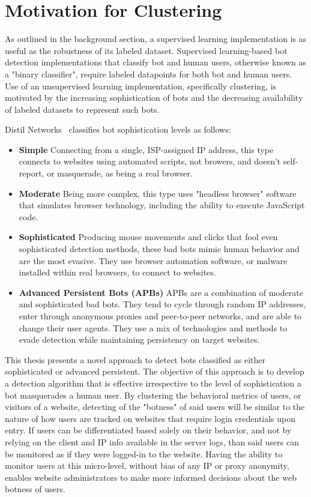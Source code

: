 
\section{Motivation for Clustering}\label{sec:motivation-for-clustering}
As outlined in the background section, a supervised learning implementation is as useful as the robustness of its labeled dataset.
Supervised learning-based bot detection implementations that classify bot and human users, otherwise known as a "binary classifier", require labeled datapoints for both bot and human users.
Use of an unsupervised learning implementation, specifically clustering, is motivated by the increasing sophistication of bots and the decreasing availability of labeled datasets to represent such bots.

Distil Networks~\cite{bad_bot_report} classifies bot sophistication levels as follows:
\begin{itemize}
    \item \textbf{Simple}
        Connecting from a single, ISP-assigned IP address, this type connects to websites using automated scripts, not browers, and doesn't self-report, or masquerade, as being a real browser.
    \item \textbf{Moderate}
        Being more complex, this type uses "headless browser" software that simulates browser technology, including the ability to execute JavaScript code.
    \item \textbf{Sophisticated}
        Producing mouse movements and clicks that fool even sophisticated detection methods, these bad bots mimic human behavior and are the most evasive. They use browser automation software, or malware installed within real browsers, to connect to websites.
    \item \textbf{Advanced Persistent Bots (APBs)}
        APBs are a combination of moderate and sophisticated bad bots. They tend to cycle through random IP addresses, enter through anonymous proxies and peer-to-peer networks, and are able to change their user agents. They use a mix of technologies and methods to evade detection while maintaining persistency on target websites.
\end{itemize}
This thesis presents a novel approach to detect bots classified as either sophisticated or advanced persistent.
The objective of this approach is to develop a detection algorithm that is effective irrespective to the level of sophistication a bot masquerades a human user.
By clustering the behavioral metrics of users, or visitors of a website, detecting of the "botness" of said users will be similar to the nature of how users are tracked on websites that require login credentials upon entry.
If users can be differentiated based solely on their behavior, and not by relying on the client and IP info available in the server logs, than said users can be monitored as if they were logged-in to the website.
Having the ability to monitor users at this micro-level, without bias of any IP or proxy anonymity, enables website administrators to make more informed decisions about the web botness of users.

